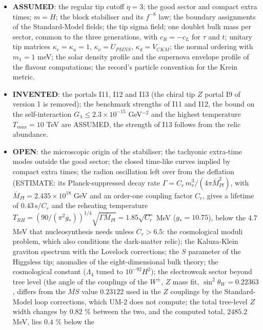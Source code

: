 \documentclass[
  10pt,
]{article}
\providecommand{\tightlist}{%
  \setlength{\itemsep}{0pt}\setlength{\parskip}{0pt}}
\begin{document}
\begin{itemize}
\tightlist
\item
  \textbf{ASSUMED}: the regular tip cutoff \(\eta = 3\); the good sector
  and compact extra times; \(m = H\); the block stabiliser and its
  \(f^{-8}\) law; the boundary assignments of the Standard-Model fields;
  the tip sigma field; one doublet bulk mass per sector, common to the
  three generations, with \(c_R = -c_L\) for \(\tau\) and \(t\); unitary
  tip matrices \(\kappa_e = \kappa_u = 1\), \(\kappa_\nu = U_{PMNS}\),
  \(\kappa_d = V_{CKM}\); the normal ordering with \(m_1 = 1\) meV; the
  solar density profile and the supernova envelope profile of the
  flavour computations; the record's particle convention for the Krein
  metric.
\item
  \textbf{INVENTED}: the portals I11, I12 and I13 (the chiral tip \(Z\)
  portal I9 of version 1 is removed); the benchmark strengths of I11 and
  I12, the bound on the self-interaction
  \(G_\lambda \le 2.3\times10^{-15}\) GeV\(^{-2}\) and the highest
  temperature \(T_{max} = 10\) TeV are ASSUMED, the strength of I13
  follows from the relic abundance.
\item
  \textbf{OPEN}: the microscopic origin of the stabiliser; the tachyonic
  extra-time modes outside the good sector; the closed time-like curves
  implied by compact extra times; the radion oscillation left over from
  the deflation (ESTIMATE: its Planck-suppressed decay rate
  \(\Gamma = C_r\,m_r^3/(4\pi\bar M_{Pl}^2)\), with
  \(\bar M_{Pl} = 2.435\times10^{18}\) GeV and an order-one coupling
  factor \(C_r\), gives a lifetime of \(0.43\,\text{s}/C_r\) and the
  reheating temperature
  \(T_{RH} = (90/(\pi^2g_*))^{1/4}\sqrt{\Gamma\bar M_{Pl}} = 1.85\sqrt{C_r}\)
  MeV (\(g_* = 10.75\)), below the 4.7 MeV that nucleosynthesis needs
  unless \(C_r > 6.5\): the cosmological moduli problem, which also
  conditions the dark-matter relic); the Kaluza-Klein graviton spectrum
  with the Lovelock corrections; the \(S\) parameter of the Higgsless
  tip; anomalies of the eight-dimensional bulk theory; the cosmological
  constant (\(\Lambda_4\) tuned to \(10^{-92}H^2\)); the electroweak
  sector beyond tree level (the angle of the couplings of the \(W^\pm\),
  \(Z\) mass fit, \(\sin^2\theta_W = 0.22363\), differs from the
  \(\overline{MS}\) value \(0.23122\) used in the \(Z\) couplings by the
  Standard-Model loop corrections, which UM-2 does not compute; the
  total tree-level \(Z\) width changes by \(0.82\) \% between the two,
  and the computed total, \(2485.2\) MeV, lies \(0.4\) \% below the

\end{itemize}
\end{document}
